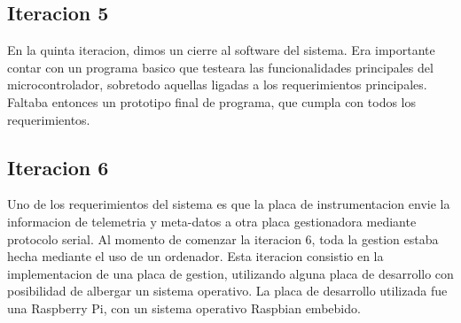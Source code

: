 
\subsection{Iteracion 5} %
\label{sub:iteracion_5}

En la quinta iteracion, dimos un cierre al software del sistema. Era importante contar con un programa basico que testeara las funcionalidades principales del microcontrolador, sobretodo aquellas ligadas a los requerimientos principales. Faltaba entonces un prototipo final de programa, que cumpla con todos los requerimientos. 


\subsection{Iteracion 6} %
\label{sub:iteracion_6}

Uno de los requerimientos del sistema es que la placa de instrumentacion envie la informacion de telemetria y meta-datos a otra placa gestionadora mediante protocolo serial. Al momento de comenzar la iteracion 6, toda la gestion estaba hecha mediante el uso de un ordenador. Esta iteracion consistio en la implementacion de una placa de gestion, utilizando alguna placa de desarrollo con posibilidad de albergar un sistema operativo. 
La placa de desarrollo utilizada fue una Raspberry Pi, con un sistema operativo Raspbian embebido. 



